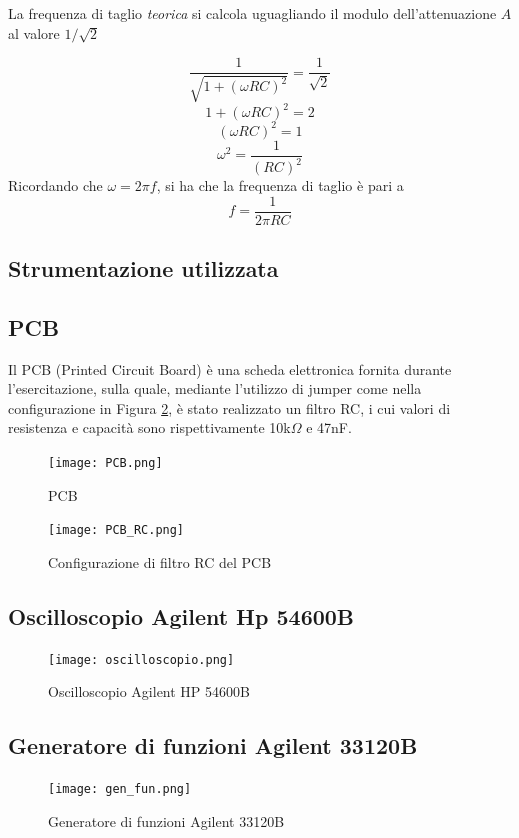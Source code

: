 La frequenza di taglio \emph{teorica} si calcola uguagliando il modulo dell'attenuazione $A$ al valore $1/\sqrt{2}$

\[\frac{1}{\sqrt{1+(\omega RC)^2}} = \frac{1}{\sqrt{2}}\]
\[1+(\omega RC)^2 = 2\] 
\[(\omega RC)^2 = 1\]
\[\omega ^2 = \frac{1}{(RC)^2}\]
Ricordando che $\omega = 2\pi f$, si ha che la frequenza di taglio è pari a 
\[f=\frac{1}{2\pi RC}\]

\subsection{Strumentazione utilizzata}
\subsection*{PCB}
Il PCB (Printed Circuit Board) è una scheda elettronica fornita durante l'esercitazione, sulla quale, mediante l'utilizzo di jumper come nella configurazione in Figura \ref{fig:pcb_rc}, è stato realizzato un filtro RC, i cui valori di resistenza e capacità sono rispettivamente 10k$\Omega$ e 47nF.

\begin{figure}[h]
    \centering
    \texttt{[image: PCB.png]} 
    \caption{PCB}
    \label{fig:pcb}
\end{figure}

\begin{figure}[h]
    \centering
    \texttt{[image: PCB\_RC.png]}
    \caption{Configurazione di filtro RC del PCB}
    \label{fig:pcb_rc}
\end{figure}
\FloatBarrier

\clearpage
\subsection*{Oscilloscopio Agilent Hp 54600B}
\begin{figure}[h]
    \centering
    \texttt{[image: oscilloscopio.png]}
    \caption{Oscilloscopio Agilent HP 54600B}
    \label{fig:enter-label}
\end{figure}
\FloatBarrier

\subsection*{Generatore di funzioni Agilent 33120B}
\begin{figure}[h]
    \centering
    \texttt{[image: gen\_fun.png]}
    \caption{Generatore di funzioni Agilent 33120B}
    \label{fig:gen_fun}
\end{figure}
\FloatBarrier

